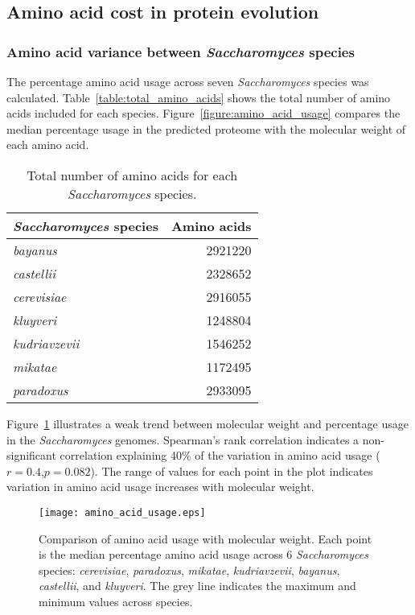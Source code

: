 \subsection{Amino acid cost in protein evolution}

\subsubsection{Amino acid variance between \emph{Saccharomyces} species}

The percentage amino acid usage across seven \emph{Saccharomyces} species was calculated. Table~\vref{table:total_amino_acids} shows the total number of amino acids included for each species. Figure~\vref{figure:amino_acid_usage} compares the median percentage usage in the predicted proteome with the molecular weight of each amino acid.

\begin{table}
  \centering
  \begin{tabular}{ l r }
                                                  \toprule
    \emph{Saccharomyces} species & Amino acids \\ \midrule
    \emph{bayanus}               & 2921220     \\
    \emph{castellii}             & 2328652     \\
    \emph{cerevisiae}            & 2916055     \\
    \emph{kluyveri}              & 1248804     \\
    \emph{kudriavzevii}          & 1546252     \\
    \emph{mikatae}               & 1172495     \\
    \emph{paradoxus}             & 2933095     \\ \bottomrule
  \end{tabular}
  \caption{Total number of amino acids for each \emph{Saccharomyces} species.}
  \label{table:total_amino_acids}
\end{table}

Figure~\ref{figure:amino_acid_usage} illustrates a weak trend between molecular weight and percentage usage in the \emph{Saccharomyces} genomes. Spearman's rank correlation indicates a non-significant correlation explaining 40\% of the variation in amino acid usage ($r = 0.4$,$p = 0.082$). The range of values for each point in the plot indicates variation in amino acid usage increases with molecular weight.

\begin{figure}
  \centering
  \texttt{[image: amino\_acid\_usage.eps]}
  \caption[Comparison of amino acid usage with molecular weight]{Comparison of amino acid usage with molecular weight. Each point is the median percentage amino acid usage across 6 \emph{Saccharomyces} species: \emph{cerevisiae}, \emph{paradoxus}, \emph{mikatae}, \emph{kudriavzevii}, \emph{bayanus}, \emph{castellii}, and \emph{kluyveri}. The grey line indicates the maximum and minimum values across species.}
  \label{figure:amino_acid_usage}
\end{figure}

